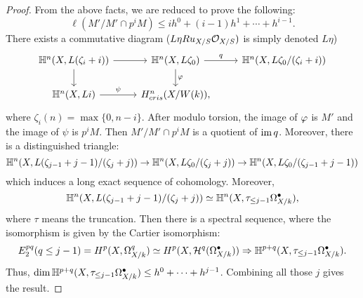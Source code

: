 \begin{proof}
    From the above facts, we are reduced to prove the following:
    \[
        \ell(M'/M' \cap p^i M) \leq i h^0 + (i - 1) h^1 + \cdots+ h^{i - 1}. 
    \]
    There exists a commutative diagram ($L\eta Ru_{X/S}{\mathcal {O}}_{X/S})$ is simply denoted $L\eta$)
    \[
        \begin{tikzcd}
            \BH^n(X, L(\zeta_i + i)) \ar[r] \ar[d] & 
            \BH^n(X, L\zeta_0) \ar[r, "q"] \ar[d,"\vp"] & 
            \BH^n(X, L\zeta_0/(\zeta_i + i)) \\
            \BH^n(X, Li) \ar[r, "\psi"] & \Hkn,
        \end{tikzcd}
    \]
    where $\zeta_i(n) = \max \{0, n - i\}$.
    After modulo torsion, the image of $\varphi$ is $M'$ and the image of $\psi$ is $p^i M$. 
    Then $M'/M' \cap p^i M$ is a quotient of $\operatorname{im} q$. 
    Moreover, there is a distinguished triangle:
    \[
        {\mathbb {H}}^n(X, L(\zeta_{j - 1} + j - 1)/(\zeta_j + j)) \to 
        {\mathbb {H}}^n(X, L\zeta_0/(\zeta_j + j)) \to 
        {\mathbb {H}}^n(X, L\zeta_0/(\zeta_{j-1} + j - 1))
    \]
    which induces a long exact sequence of cohomology. Moreover, 
    \[
        {\mathbb {H}}^n(X, L(\zeta_{j - 1} + j - 1)/(\zeta_j + j)) 
        \simeq {\mathbb {H}}^n(X, \tau_{\leq j - 1} \Omega_{X/k}^\bullet),
    \]
    where $\tau$ means the truncation.
    Then there is a spectral sequence, 
    where the isomorphism is given by the Cartier isomorphism:
    \[
        E_2^{pq}(q \leq j - 1) = H^p(X, \Omega_{X/k}^q) 
        \simeq H^p(X, {\mathcal {H}}^q(\Omega_{X/k}^\bullet)) 
        \Rightarrow {\mathbb {H}}^{p+q}(X, \tau_{\leq j - 1} \Omega_{X/k}^\bullet).
    \]
    Thus, $\dim {\mathbb {H}}^{p+q}(X, \tau_{\leq j - 1} \Omega_{X/k}^\bullet) \leq h^0 + \cdots + h^{j - 1}$. 
    Combining all those $j$ gives the result.
\end{proof}